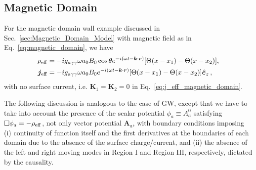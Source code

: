 \documentclass[a4paper,11pt]{article}
\begin{document}
\subsection{Magnetic Domain}

For the magnetic domain wall example discussed in Sec.~\ref{sec:Magnetic_Domain_Model} with magnetic field as in Eq.~\eqref{eq:magnetic_domain}, we have
%
\begin{equation}
    \begin{aligned}
    \rho_{\rm eff} & = - i g_{a\gamma\gamma} \omega a_{0} B_{0} \cos \theta e^{ -i (\omega t - \bm{k} \cdot \bm{r} ) }  [\Theta(x-x_{1}) - \Theta(x-x_{2})] , \\ 
    {\bm j}_{\rm eff} & = - i g_{a\gamma\gamma} \omega a_{0} B_{0}  e^{ -i (\omega t - \bm{k} \cdot \bm{r} ) }  [\Theta(x-x_{1}) - \Theta(x-x_{2})]  \hat{\bm{e}}_{z} \,,
    \end{aligned}
\end{equation}
%
with no surface current, i.e. $ \bm{K}_{1} = \bm{K}_{2} = 0  $ in Eq.~\eqref{eq:j_eff_magnetic_domain}.

The following discussion is analogous to the case of GW, except that we have to take into account the presence of the scalar potential $ \phi_{a} \equiv A_{a}^{0} $ satisfying $ \Box \phi_{a} = -\rho_{\rm eff} $, not only vector potential $ \bm{A}_{a} $, with boundary conditions imposing (i) continuity of function itself and the first derivatives at the boundaries of each domain due to the absence of the surface charge/current, and (ii) the absence of the left and right moving modes in Region I and Region III, respectively, dictated by the causality.
\end{document}
